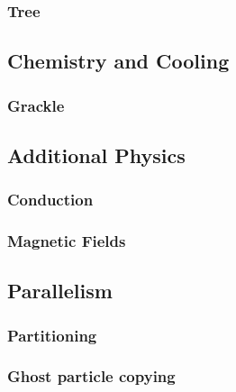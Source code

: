 \subsubsection{Tree}

\subsection{Chemistry and Cooling}
\subsubsection{Grackle}

\subsection{Additional Physics}
\subsubsection{Conduction}
\subsubsection{Magnetic Fields}

\subsection{Parallelism}
\subsubsection{Partitioning}
\subsubsection{Ghost particle copying}
